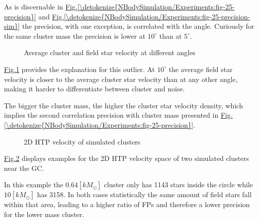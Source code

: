 \documentclass[letterpaper,10pt,english]{sphinxmanual}
\begin{document}
\sphinxAtStartPar
As is discernable in \hyperref[\detokenize{NBodySimulation/Experiments:fig-25-precision}]{Fig.\@ \ref{\detokenize{NBodySimulation/Experiments:fig-25-precision}}} and \hyperref[\detokenize{NBodySimulation/Experiments:fig-25-precision-sim}]{Fig.\@ \ref{\detokenize{NBodySimulation/Experiments:fig-25-precision-sim}}} the precision, with one exception, is correlated with the angle.
Curiously for the same cluster mass the precision is lower at \(10^\circ\) than at \(5^\circ\).

\begin{figure}[htbp]
\centering
\capstart

\noindent{}
\caption{Average cluster and field star velocity at different angles}\label{\detokenize{NBodySimulation/Experiments:id7}}\label{\detokenize{NBodySimulation/Experiments:fig-25-avg-vel-640}}\end{figure}

\sphinxAtStartPar
\hyperref[\detokenize{NBodySimulation/Experiments:fig-25-avg-vel-640}]{Fig.\@ \ref{\detokenize{NBodySimulation/Experiments:fig-25-avg-vel-640}}} provides the explanation for this outlier.
At \(10^\circ\) the average field star velocity is closer to the average cluster star velocity than at any other angle, making it harder to differentiate between cluster and noise.

\sphinxAtStartPar
The bigger the cluster mass, the higher the cluster star velocity density, which implies the second correlation \sphinxhyphen{} precision with cluster mass \sphinxhyphen{} presented in \hyperref[\detokenize{NBodySimulation/Experiments:fig-25-precision}]{Fig.\@ \ref{\detokenize{NBodySimulation/Experiments:fig-25-precision}}}.

\begin{figure}[htbp]
\centering
\capstart

\noindent{}
\caption{2D HTP velocity of simulated clusters}\label{\detokenize{NBodySimulation/Experiments:id8}}\label{\detokenize{NBodySimulation/Experiments:fig-25-vel-scatter}}\end{figure}

\sphinxAtStartPar
\hyperref[\detokenize{NBodySimulation/Experiments:fig-25-vel-scatter}]{Fig.\@ \ref{\detokenize{NBodySimulation/Experiments:fig-25-vel-scatter}}} displays examples for the 2D HTP velocity space of two simulated clusters near the GC.

\sphinxAtStartPar
In this example the \(0.64 [kM_{\odot}]\) cluster only has 1143 stars inside the circle while \(10 [kM_{\odot}]\) has 3158.
In both cases statistically the same amount of field stars fall within that area, leading to a higher ratio of FPs and therefore a lower precision for the lower mass cluster.
\end{document}
